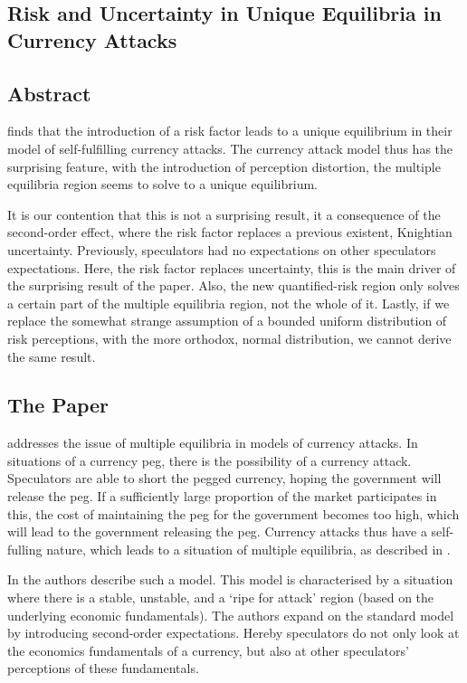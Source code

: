 \begin{refsection}
\chapter{Risk and Uncertainty in Unique Equilibria in Currency Attacks}
\label{unc}
\section*{Abstract}
\textcite{morris1998unique} finds that the introduction of a risk factor leads to a unique equilibrium in their model of self-fulfilling currency attacks.
The currency attack model thus has the surprising feature, with the introduction of perception distortion,
the multiple equilibria region seems to solve to a unique equilibrium.

It is our contention that this is not a surprising result, it a consequence of the second-order effect,
where the risk factor replaces a previous existent, Knightian uncertainty.
Previously, speculators had no expectations on other speculators expectations.
Here, the risk factor replaces uncertainty, this is the main driver of the surprising result of the paper.
Also, the new quantified-risk region only solves a certain part of the multiple equilibria region, not the whole of it.
Lastly, if we replace the somewhat strange assumption of a bounded uniform distribution of risk perceptions,
with the more orthodox, normal distribution, we cannot derive the same result.
\pagebreak

\section{The Paper}
\label{unc:idea}
\textcite{morris1998unique} addresses the issue of multiple equilibria in models of currency attacks.
In situations of a currency peg, there is the possibility of a currency attack.
Speculators are able to short the pegged currency, hoping the government will release the peg.
If a sufficiently large proportion of the market participates in this,
the cost of maintaining the peg for the government becomes too high,
which will lead to the government releasing the peg.
Currency attacks thus have a self-fulling nature,
which leads to a situation of multiple equilibria,
as described in \textcite{obstfeld1986rational,obstfeld1995logic,obstfeld1996models}.

In \textcite{morris1998unique} the authors describe such a model.
This model is characterised by a situation where there is a stable, unstable,
and a `ripe for attack' region (based on the underlying economic fundamentals).
The authors expand on the standard model by introducing second-order expectations.
Hereby speculators do not only look at the economics fundamentals of a currency,
but also at other speculators' perceptions of these fundamentals.


\end{refsection}

